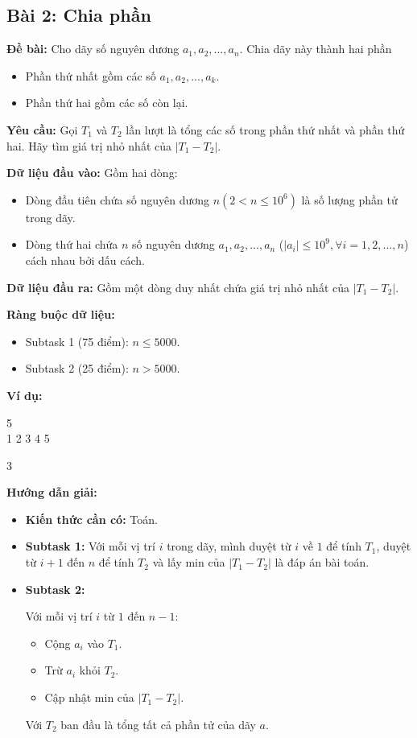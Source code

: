 \documentclass[12pt]{scrartcl}  %
\begin{document}
\subsection{Bài 2: Chia phần}
\textbf{Đề bài:}
Cho dãy số nguyên dương $a_1, a_2, ..., a_n$. Chia dãy này thành hai phần
\begin{itemize}
    \item Phần thứ nhất gồm các số $a_1, a_2, ..., a_k$.
    \item Phần thứ hai gồm các số còn lại.
\end{itemize}

\textbf{Yêu cầu:}
Gọi $T_1$ và $T_2$ lần lượt là tổng các số trong phần thứ nhất và phần thứ hai. Hãy tìm giá trị nhỏ nhất của $|T_1 - T_2|$.

\textbf{Dữ liệu đầu vào:}
Gồm hai dòng:
\begin{itemize}
    \item Dòng đầu tiên chứa số nguyên dương $n (2 < n \leq 10^6)$ là số lượng phần tử trong dãy.
    \item Dòng thứ hai chứa $n$ số nguyên dương $a_1, a_2, ..., a_n$ ($ | a_i | \le 10^9, \forall i = 1,2,...,n$) cách nhau bởi dấu cách.
\end{itemize}

\textbf{Dữ liệu đầu ra:}
Gồm một dòng duy nhất chứa giá trị nhỏ nhất của $|T_1 - T_2|$.

\textbf{Ràng buộc dữ liệu:}

\begin{itemize}
    \item Subtask 1 (75 điểm): $n \le 5000$.
    \item Subtask 2 (25 điểm): $n > 5000$.
\end{itemize}

\textbf{Ví dụ:}
\begin{tcolorbox}[colback=gray!5!white, colframe=blue!50!black, title=Input]
5\\
1 2 3 4 5
\end{tcolorbox}
\begin{tcolorbox}[colback=gray!5!white, colframe=green!50!black, title=Output]
3
\end{tcolorbox}

\textbf{Hướng dẫn giải:}
\begin{itemize}
    \item \textbf{Kiến thức cần có:} Toán.
    \item \textbf{Subtask 1:} Với mỗi vị trí $i$ trong dãy, mình duyệt từ $i$ về $1$ để
    tính $T_1$, duyệt từ $i + 1$ đến $n$ để tính $T_2$ và lấy min của $|T_1 - T_2|$ là đáp án bài toán.
    \item \textbf{Subtask 2:}
    
    Với mỗi vị trí $i$ từ $1$ đến $n - 1$:
    \begin{itemize}
        \item Cộng $a_i$ vào $T_1$.
        \item Trừ $a_i$ khỏi $T_2$.
        \item Cập nhật min của $|T_1 - T_2|$.
    \end{itemize}
    
    Với $T_2$ ban đầu là tổng tất cả phần tử của dãy $a$.
\end{itemize}
\end{document}
